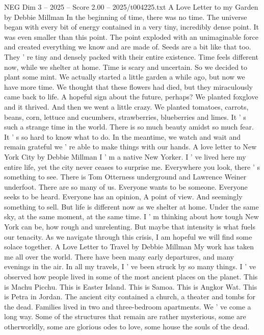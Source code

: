 \begin{textsample}{NEG Dim 3 – 2025 – Score 2.00 – 2025/t004225.txt}  \label{ex:f3_neg_055}
A Love Letter to my Garden by Debbie Millman In the beginning of time, there was no time.
The universe began with every bit of energy contained in a very tiny, incredibly dense point.
It was even smaller than this point.
The point exploded with an unimaginable force and created everything we know and are made of.
Seeds are a bit like that too.
They ' re tiny and densely packed with their entire existence.
Time feels different now, while we shelter at home.
Time is scary and uncertain.
So we decided to plant some mint.
We actually started a little garden a while ago, but now we have more time.
We thought that these flowers had died, but they miraculously came back to life.
A hopeful sign about the future, perhaps?
We planted foxglove and it thrived.
And then we went a little crazy.
We planted tomatoes, carrots, beans, corn, lettuce and cucumbers, strawberries, blueberries and limes.
It ' s such a strange time in the world.
There is so much beauty amidst so much fear.
It ' s so hard to know what to do.
In the meantime, we watch and wait and remain grateful we ' re able to make things with our hands.
A love letter to New York City by Debbie Millman I ' m a native New Yorker.
I ' ve lived here my entire life, yet the city never ceases to surprise me.
Everywhere you look, there ' s something to see.
There is Tom Otterness underground and Lawrence Weiner underfoot.
There are so many of us.
Everyone wants to be someone.
Everyone seeks to be heard.
Everyone has an opinion, A point of view.
And seemingly something to sell.
But life is different now as we shelter at home.
Under the same sky, at the same moment, at the same time.
I ' m thinking about how tough New York can be, how rough and unrelenting.
But maybe that intensity is what fuels our tenacity.
As we navigate through this crisis, I am hopeful we will find some solace together.
A Love Letter to Travel by Debbie Millman My work has taken me all over the world.
There have been many early departures, and many evenings in the air.
In all my travels, I ' ve been struck by so many things.
I ' ve observed how people lived in some of the most ancient places on the planet.
This is Machu Picchu.
This is Easter Island.
This is Samoa.
This is Angkor Wat.
This is Petra in Jordan.
The ancient city contained a church, a theater and tombs for the dead.
Families lived in two and three-bedroom apartments.
We ' ve come a long way.
Some of the structures that remain are rather mysterious, some are otherworldly, some are glorious odes to love, some house the souls of the dead.

\end{textsample}
